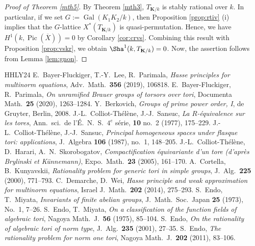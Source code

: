 \documentclass[12pt]{amsart}
\theoremstyle{plain}
\theoremstyle{definition}
\numberwithin{thm}{section}
\numberwithin{equation}{section}
\newcommand{\bK}{\mathbf{K}}
\DeclareMathOperator{\Gal}{Gal}
\DeclareMathOperator{\Pic}{Pic}
\begin{document}
\begin{proof}[Proof of Theorem \ref{mth5}]
By Theorem \ref{mth3}, $T_{\bK/k}$ is stably rational over $k$. In particular, if we set $G:=\Gal(K_{1}K_{2}/k)$, then Proposition \ref{prop:rtiv} (i) implies that the $G$-lattice $X^{*}(T_{\bK/k})$ is quasi-permutation. Hence, we have $H^{1}(k,\Pic(\overline{X}))=0$ by Corollary \ref{cor:crvs}. Combining this result with Proposition \ref{prop:vskr}, we obtain $\Sha^{1}(k,T_{\bK/k})=0$. Now, the assertion follows from Lemma \ref{lem:gnon}. 
\end{proof}

\begin{thebibliography}{HHLY24}
E.~Bayer-Fluckiger, T.-Y.~Lee, R.~Parimala, \emph{Hasse principles for multinorm equations}, Adv.~Math.~\textbf{356} (2019), 106818. 
E.~Bayer-Fluckiger, R.~Parimala, \emph{On unramified Brauer groups of torsors over tori}, Documenta Math.~\textbf{25} (2020), 1263--1284. 
Y.~Berkovich, \emph{Groups of prime power order, I}, de Gruyter, Berlin, 2008.
J.-L.~Colliot-Th{\'e}l{\`e}ne, J.-J.~Sansuc, \emph{La $R$-{\'e}quivalence sur les tores}, Ann.~sci.~de l'{\'E}.~N.~S.~$4^{e}$ s{\'e}rie, \textbf{10} no.~2 (1977), 175--229. 
J.-L.~Colliot-Th{\'e}l{\`e}ne, J.-J.~Sansuc, \emph{Principal homogeneous spaces under flasque tori: applications}, J.~Algebra \textbf{106} (1987), no.~1, 148--205. 
J.-L.~Colliot-Th{\'e}l{\`e}ne, D.~Harari, A.~N.~Skorobogatov, \emph{Compactification {\'e}quivariante d’un tore (d’apr{\`e}s Brylinski et K{\"u}nnemann)}, Expo.~Math.~\textbf{23} (2005), 161--170.
A.~Cortella, B.~Kunyavskii, \emph{Rationality problem for generic tori in simple groups}, J.~Alg.~\textbf{225} (2000), 771--793.
C.~Demarche, D.~Wei, \emph{Hasse principle and weak approximation for multinorm equations}, Israel J.~Math.~\textbf{202} (2014), 275--293. 
S.~Endo, T.~Miyata, \emph{Invariants of finite abelian groups}, J.~Math.~Soc.~Japan \textbf{25} (1973), No.~1, 7--26. 
S.~Endo, T.~Miyata, \emph{On a classification of the function fields of algebraic tori}, Nagoya Math.~J.~\textbf{56} (1975), 85--104. 
S.~Endo, \emph{On the rationality of algebraic tori of norm type}, J.~Alg.~\textbf{235} (2001), 27--35. 
S.~Endo, \emph{The rationality problem for norm one tori}, Nagoya Math.~J.~\textbf{202} (2011), 83--106. 

\end{thebibliography}
\end{document}
